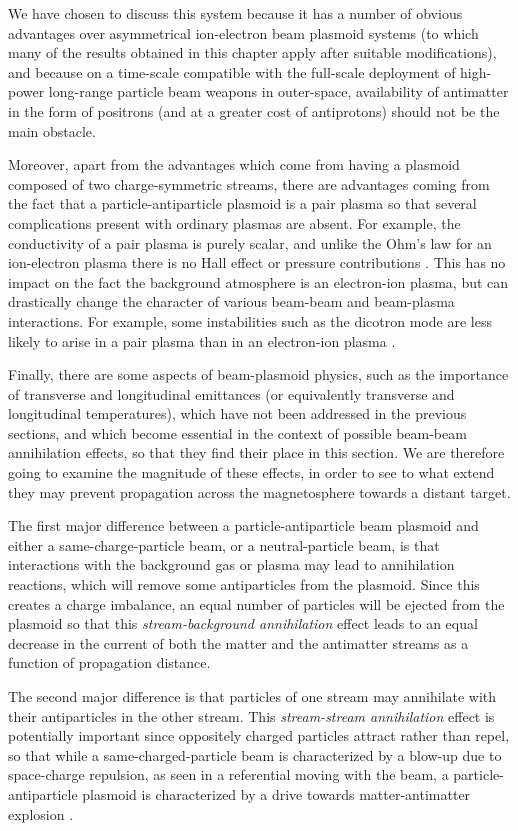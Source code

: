 \documentclass [12pt,a4paper,     ]{report} %
\begin{document}
We have chosen to discuss this system because it has a number of obvious advantages over asymmetrical ion-electron beam plasmoid systems (to which many of the results obtained in this chapter apply after suitable modifications), and because on a time-scale compatible with the full-scale deployment of high-power long-range particle beam weapons in outer-space, availability of antimatter in the form of positrons (and at a greater cost of antiprotons) should not be the main obstacle.

Moreover, apart from the advantages which come from having a plasmoid composed of two charge-symmetric streams, there are advantages coming from the fact that a particle-antiparticle plasmoid is a pair plasma so that several complications present with ordinary plasmas are absent.  For example, the conductivity of a pair plasma is purely scalar, and unlike the Ohm's law for an ion-electron plasma there is no Hall effect or pressure contributions \cite{BLACK1993-}.  This has no impact on the fact the background atmosphere is an electron-ion plasma, but can drastically change the character of various beam-beam and beam-plasma interactions.  For example, some instabilities such as the dicotron mode are less likely to arise in a pair plasma than in an electron-ion plasma \cite{GALVE1988-}.

Finally, there are some aspects of beam-plasmoid physics, such as the importance of transverse and longitudinal emittances (or equivalently transverse and longitudinal temperatures), which have not been addressed in the previous sections, and which become essential in the context of possible beam-beam annihilation effects, so that they find their place in this section.   We are therefore going to examine the magnitude of these effects, in order to see to what extend they may prevent propagation across the magnetosphere towards a distant target.

The first major difference between a particle-antiparticle beam plasmoid and either a same-charge-particle beam, or a neutral-particle beam, is that interactions with the background gas or plasma may lead to annihilation reactions, which will remove some antiparticles from the plasmoid.  Since this creates a charge imbalance, an equal number of particles will be ejected from the plasmoid so that this \emph{stream-background annihilation} effect leads to an equal decrease in the current of both the matter and the antimatter streams as a function of propagation distance.

The second major difference is that particles of one stream may annihilate with their antiparticles in the other stream.  This \emph{stream-stream annihilation} effect is potentially important since oppositely charged particles attract rather than repel, so that while a same-charged-particle beam is characterized by a blow-up due to space-charge repulsion, as seen in a referential moving with the beam, a particle-antiparticle plasmoid is characterized by a drive towards matter-antimatter explosion \cite{GSPON1987A}.
\end{document}
